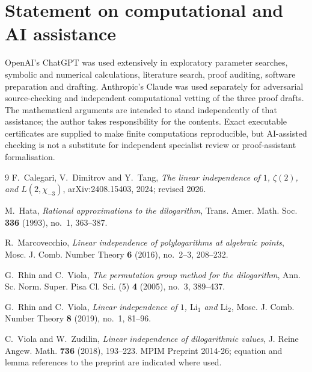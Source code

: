 \documentclass[11pt]{amsart}
\theoremstyle{plain}
\theoremstyle{remark}\newtheorem{remark}[theorem]{Remark}
\numberwithin{equation}{section}
\begin{document}
\section*{Statement on computational and AI assistance}
OpenAI's ChatGPT was used extensively in exploratory parameter searches, symbolic and numerical calculations, literature search, proof auditing, software preparation and drafting.  Anthropic's Claude was used separately for adversarial source-checking and independent computational vetting of the three proof drafts.  The mathematical arguments are intended to stand independently of that assistance; the author takes responsibility for the contents.  Exact executable certificates are supplied to make finite computations reproducible, but AI-assisted checking is not a substitute for independent specialist review or proof-assistant formalisation.

\begin{thebibliography}{9}
F.~Calegari, V.~Dimitrov and Y.~Tang,
\emph{The linear independence of $1$, $\zeta(2)$, and $L(2,\chi_{-3})$},
arXiv:2408.15403, 2024; revised 2026.

M.~Hata,
\emph{Rational approximations to the dilogarithm},
Trans. Amer. Math. Soc. \textbf{336} (1993), no.~1, 363--387.

R.~Marcovecchio,
\emph{Linear independence of polylogarithms at algebraic points},
Mosc. J. Comb. Number Theory \textbf{6} (2016), no.~2--3, 208--232.

G.~Rhin and C.~Viola,
\emph{The permutation group method for the dilogarithm},
Ann. Sc. Norm. Super. Pisa Cl. Sci. (5) \textbf{4} (2005), no.~3, 389--437.

G.~Rhin and C.~Viola,
\emph{Linear independence of $1$, $\mathrm{Li}_1$ and $\mathrm{Li}_2$},
Mosc. J. Comb. Number Theory \textbf{8} (2019), no.~1, 81--96.

C.~Viola and W.~Zudilin,
\emph{Linear independence of dilogarithmic values},
J. Reine Angew. Math. \textbf{736} (2018), 193--223.
MPIM Preprint 2014-26; equation and lemma references to the preprint are indicated where used.
\end{thebibliography}
\end{document}
